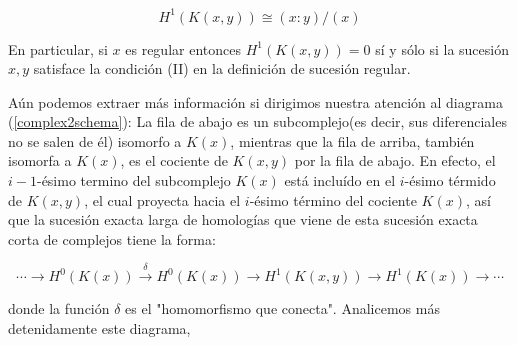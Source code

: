 $$H^1(K(x,y))\cong(x:y)/(x)$$

En particular, si $x$ es regular entonces $H^1(K(x,y)) = 0$ sí y sólo si la sucesión $x, y$ satisface la condición (II) en la definición de sucesión regular.

Aún podemos extraer más información si dirigimos nuestra atención al diagrama (\ref{complex2schema}): La fila de abajo es un subcomplejo(es decir, sus diferenciales no se salen de él) isomorfo a $K(x)$, mientras que la fila de arriba, también isomorfa a $K(x)$, es el cociente de $K(x, y)$ por la fila de abajo. En efecto, el $i-1$-ésimo termino del subcomplejo $K(x)$ está incluído en el $i$-ésimo térmido de $K(x, y)$, el cual proyecta hacia el $i$-ésimo término del cociente $K(x)$, así que la sucesión exacta larga de homologías que viene de esta sucesión exacta corta de complejos tiene la forma:

$$\cdots \rightarrow H^0(K(x)) \xrightarrow{\delta} H^0(K(x)) \rightarrow H^1(K(x, y)) \rightarrow H^1(K(x)) \rightarrow \cdots$$

donde la función $\delta$ es el "homomorfismo que conecta". Analicemos más detenidamente este diagrama, 